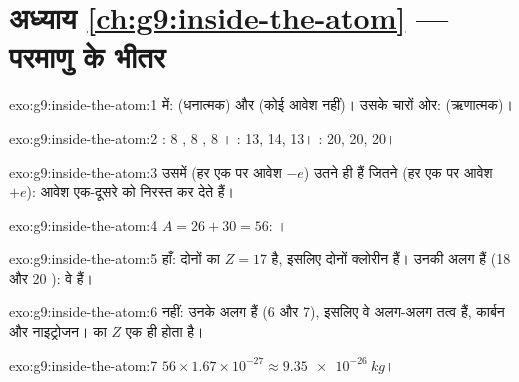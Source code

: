 \section*{अध्याय \ref{ch:g9:inside-the-atom} --- परमाणु के भीतर}

\begin{solution}{exo:g9:inside-the-atom:1}
 में:  (धनात्मक) और  (कोई आवेश नहीं)। उसके चारों ओर:
 (ऋणात्मक)।
\end{solution}

\begin{solution}{exo:g9:inside-the-atom:2}
: 8 , 8 , 8 ।
: 13, 14, 13। : 20, 20, 20।
\end{solution}

\begin{solution}{exo:g9:inside-the-atom:3}
उसमें  (हर एक पर आवेश $-e$) उतने ही हैं जितने  (हर एक पर
आवेश $+e$): आवेश एक-दूसरे को निरस्त कर देते हैं।
\end{solution}

\begin{solution}{exo:g9:inside-the-atom:4}
$A = 26 + 30 = 56$: ।
\end{solution}

\begin{solution}{exo:g9:inside-the-atom:5}
हाँ: दोनों का $Z = 17$ है, इसलिए दोनों क्लोरीन हैं। उनकी 
अलग हैं (18 और 20 ): वे  हैं।
\end{solution}

\begin{solution}{exo:g9:inside-the-atom:6}
नहीं: उनके  अलग हैं (6 और 7), इसलिए वे अलग-अलग तत्व हैं,
कार्बन और नाइट्रोजन।  का $Z$ एक ही होता है।
\end{solution}

\begin{solution}{exo:g9:inside-the-atom:7}
$56 \times 1.67 \times 10^{-27} \approx \qty{9.35e-26}{kg}$।
\end{solution}

